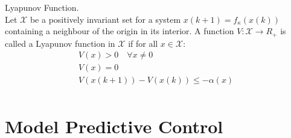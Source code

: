\begin{definition}{Lyapunov Function}. \\
	Let $\mathcal{X}$ be a positively invariant set for a system $x(k+1) = f_\kappa (x(k))$ containing a neighbour of the origin in its interior. A function $V : \mathcal{X} \rightarrow R_+$ is called a Lyapunov function in $\mathcal{X}$ if for all $x \in \mathcal{X}$:
	\begin{align*}
		&V(x) > 0 \quad \forall x \neq 0\\
		&V(x) = 0 \quad\\
		&V(x(k+1)) - V(x(k)) \leq -\alpha(x) \quad\\
	\end{align*}
	
	
\end{definition}




\section{Model Predictive Control}\label{sec:mpc_theory}

